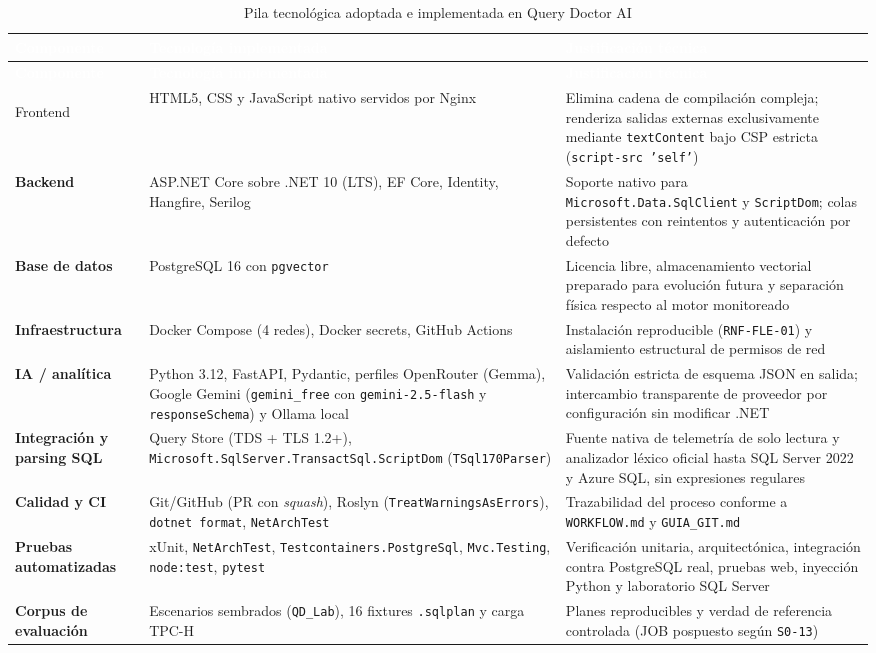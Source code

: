 \documentclass[12pt,a4paper]{article}
\begin{document}
\begingroup
{}
\scriptsize
\begin{longtable}{>{\bfseries}p{} p{} p{}}
\toprule
\rowcolor{utbblue}
\textcolor{white}{\textbf{Componente}} & \textcolor{white}{\textbf{Tecnología implementada}} & \textcolor{white}{\textbf{Justificación técnica}} \\
\midrule
\endfirsthead
\toprule
\rowcolor{utbblue}
\textcolor{white}{\textbf{Componente}} & \textcolor{white}{\textbf{Tecnología implementada}} & \textcolor{white}{\textbf{Justificación técnica}} \\
\midrule
\endhead
\bottomrule
\caption{Pila tecnológica adoptada e implementada en Query Doctor AI}
\label{tab:tecnologias}
\endlastfoot
Frontend & HTML5, CSS y JavaScript nativo servidos por Nginx & Elimina cadena de compilación compleja; renderiza salidas externas exclusivamente mediante \texttt{textContent} bajo CSP estricta (\texttt{script-src 'self'}) \\
Backend & ASP.NET Core sobre .NET 10 (LTS), EF Core, Identity, Hangfire, Serilog & Soporte nativo para \texttt{Microsoft.Data.SqlClient} y \texttt{ScriptDom}; colas persistentes con reintentos y autenticación por defecto \\
Base de datos & PostgreSQL 16 con \texttt{pgvector} & Licencia libre, almacenamiento vectorial preparado para evolución futura y separación física respecto al motor monitoreado \\
Infraestructura & Docker Compose (4 redes), Docker secrets, GitHub Actions & Instalación reproducible (\texttt{RNF-FLE-01}) y aislamiento estructural de permisos de red \\
IA / analítica & Python 3.12, FastAPI, Pydantic, perfiles OpenRouter (Gemma), Google Gemini (\texttt{gemini\_free} con \texttt{gemini-2.5-flash} y \texttt{responseSchema}) y Ollama local & Validación estricta de esquema JSON en salida; intercambio transparente de proveedor por configuración sin modificar .NET \\
Integración y parsing SQL & Query Store (TDS + TLS 1.2+), \texttt{Microsoft.SqlServer.TransactSql.ScriptDom} (\texttt{TSql170Parser}) & Fuente nativa de telemetría de solo lectura y analizador léxico oficial hasta SQL Server 2022 y Azure SQL, sin expresiones regulares \\
Calidad y CI & Git/GitHub (PR con \textit{squash}), Roslyn (\texttt{TreatWarningsAsErrors}), \texttt{dotnet format}, \texttt{NetArchTest} & Trazabilidad del proceso conforme a \texttt{WORKFLOW.md} y \texttt{GUIA\_GIT.md} \\
Pruebas automatizadas & xUnit, \texttt{NetArchTest}, \texttt{Testcontainers.PostgreSql}, \texttt{Mvc.Testing}, \texttt{node:test}, \texttt{pytest} & Verificación unitaria, arquitectónica, integración contra PostgreSQL real, pruebas web, inyección Python y laboratorio SQL Server \\
Corpus de evaluación & Escenarios sembrados (\texttt{QD\_Lab}), 16 fixtures \texttt{.sqlplan} y carga TPC-H & Planes reproducibles y verdad de referencia controlada (JOB pospuesto según \texttt{S0-13}) \\
\end{longtable}
\endgroup
\end{document}
